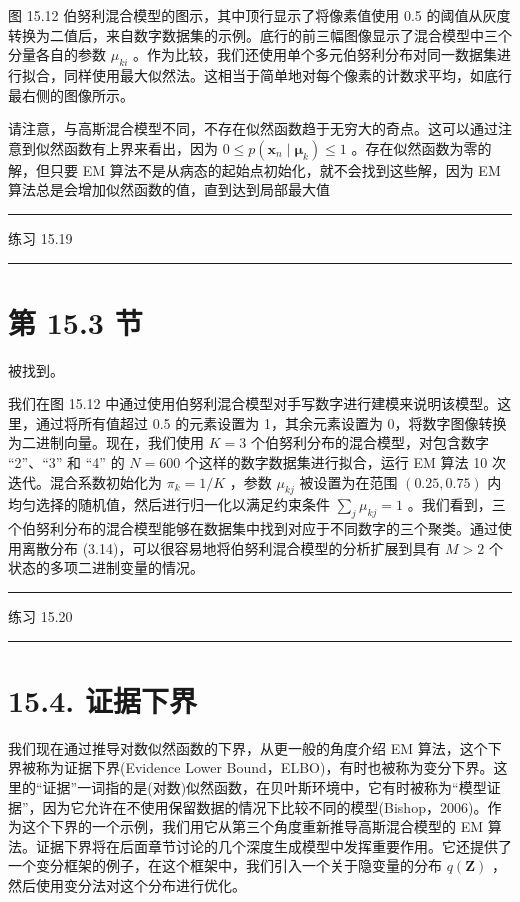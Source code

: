 \documentclass[10pt]{article}
\newcommand{\HRule}{\begin{center}\rule{0.9\linewidth}{0.2mm}\end{center}}
\begin{document}
图 15.12 伯努利混合模型的图示，其中顶行显示了将像素值使用 0.5 的阈值从灰度转换为二值后，来自数字数据集的示例。底行的前三幅图像显示了混合模型中三个分量各自的参数 \({\mu }_{ki}\) 。作为比较，我们还使用单个多元伯努利分布对同一数据集进行拟合，同样使用最大似然法。这相当于简单地对每个像素的计数求平均，如底行最右侧的图像所示。

请注意，与高斯混合模型不同，不存在似然函数趋于无穷大的奇点。这可以通过注意到似然函数有上界来看出，因为 \(0 \leq  p\left( {{\mathbf{x}}_{n} \mid  {\mathbf{\mu }}_{k}}\right)  \leq  1\) 。存在似然函数为零的解，但只要 EM 算法不是从病态的起始点初始化，就不会找到这些解，因为 EM 算法总是会增加似然函数的值，直到达到局部最大值

\HRule

练习 15.19

\HRule

\section*{第 15.3 节}

被找到。

我们在图 15.12 中通过使用伯努利混合模型对手写数字进行建模来说明该模型。这里，通过将所有值超过 0.5 的元素设置为 1，其余元素设置为 0，将数字图像转换为二进制向量。现在，我们使用 \(K = 3\) 个伯努利分布的混合模型，对包含数字 “2”、“3” 和 “4” 的 \(N = {600}\) 个这样的数字数据集进行拟合，运行 EM 算法 10 次迭代。混合系数初始化为 \({\pi }_{k} = 1/K\) ，参数 \({\mu }_{kj}\) 被设置为在范围 \(\left( {{0.25},{0.75}}\right)\) 内均匀选择的随机值，然后进行归一化以满足约束条件 \(\mathop{\sum }\limits_{j}{\mu }_{kj} = 1\) 。我们看到，三个伯努利分布的混合模型能够在数据集中找到对应于不同数字的三个聚类。通过使用离散分布 (3.14)，可以很容易地将伯努利混合模型的分析扩展到具有 \(M > 2\) 个状态的多项二进制变量的情况。

\HRule

练习 15.20

\HRule

\section*{15.4. 证据下界}

我们现在通过推导对数似然函数的下界，从更一般的角度介绍 EM 算法，这个下界被称为证据下界(Evidence Lower Bound，ELBO)，有时也被称为变分下界。这里的“证据”一词指的是(对数)似然函数，在贝叶斯环境中，它有时被称为“模型证据”，因为它允许在不使用保留数据的情况下比较不同的模型(Bishop，2006)。作为这个下界的一个示例，我们用它从第三个角度重新推导高斯混合模型的 EM 算法。证据下界将在后面章节讨论的几个深度生成模型中发挥重要作用。它还提供了一个变分框架的例子，在这个框架中，我们引入一个关于隐变量的分布 \(q\left( \mathbf{Z}\right)\) ，然后使用变分法对这个分布进行优化。
\end{document}
